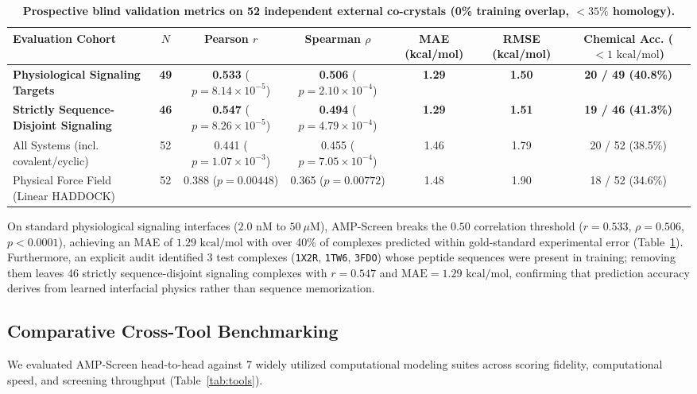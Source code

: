 \documentclass[10pt,twocolumn]{article}
\begin{document}
\begin{table}[t]
\centering
\small
\caption{\textbf{Prospective blind validation metrics on 52 independent external co-crystals (0\% training overlap, $<35\%$ homology).}}
\label{tab:benchmarks}
\begin{tabular}{lcccccc}
\toprule
\textbf{Evaluation Cohort} & \textbf{$N$} & \textbf{Pearson $r$} & \textbf{Spearman $\rho$} & \textbf{MAE (kcal/mol)} & \textbf{RMSE (kcal/mol)} & \textbf{Chemical Acc. ($<1\text{ kcal/mol}$)} \\
\midrule
\textbf{Physiological Signaling Targets} & \textbf{49} & \textbf{0.533} ($p=8.14\times 10^{-5}$) & \textbf{0.506} ($p=2.10\times 10^{-4}$) & \textbf{1.29} & \textbf{1.50} & \textbf{20 / 49 (40.8\%)} \\
\textbf{Strictly Sequence-Disjoint Signaling} & \textbf{46} & \textbf{0.547} ($p=8.26\times 10^{-5}$) & \textbf{0.494} ($p=4.79\times 10^{-4}$) & \textbf{1.29} & \textbf{1.51} & \textbf{19 / 46 (41.3\%)} \\
All Systems (incl. covalent/cyclic) & 52 & 0.441 ($p=1.07\times 10^{-3}$) & 0.455 ($p=7.05\times 10^{-4}$) & 1.46 & 1.79 & 20 / 52 (38.5\%) \\
Physical Force Field (Linear HADDOCK) & 52 & 0.388 ($p=0.00448$) & 0.365 ($p=0.00772$) & 1.48 & 1.90 & 18 / 52 (34.6\%) \\
\bottomrule
\end{tabular}
\end{table}

On standard physiological signaling interfaces ($2.0\text{ nM}$ to $50\ \mu\text{M}$), AMP-Screen breaks the $0.50$ correlation threshold ($r = 0.533$, $\rho = 0.506$, $p < 0.0001$), achieving an MAE of $1.29\text{ kcal/mol}$ with over 40\% of complexes predicted within gold-standard experimental error (Table~\ref{tab:benchmarks}). Furthermore, an explicit audit identified 3 test complexes (\texttt{1X2R}, \texttt{1TW6}, \texttt{3FDO}) whose peptide sequences were present in training; removing them leaves 46 strictly sequence-disjoint signaling complexes with $r = 0.547$ and $\text{MAE} = 1.29\text{ kcal/mol}$, confirming that prediction accuracy derives from learned interfacial physics rather than sequence memorization.

\subsection{Comparative Cross-Tool Benchmarking}
We evaluated AMP-Screen head-to-head against 7 widely utilized computational modeling suites across scoring fidelity, computational speed, and screening throughput (Table~\ref{tab:tools}).
\end{document}
